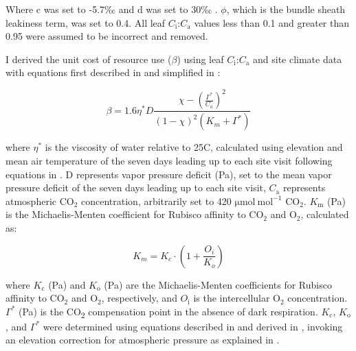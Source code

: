 \noindent Where c was set to -5.7‰ and d was set to 30‰ . $\phi$, which is the bundle sheath leakiness term, was set to 0.4. All leaf $C_\mathrm{i}$:$C_\mathrm{a}$ values less than 0.1 and greater than 0.95 were assumed to be incorrect and removed.
    
I derived the unit cost of resource use ($\beta$) using leaf $C_\mathrm{i}$:$C_\mathrm{a}$ and site climate data with equations first described in  and simplified in :

\begin{equation}
    \label{eq_4.5}
    \beta = 1.6\eta^{*} D \frac{\chi - (\frac{\Gamma^*}{C_{a}})^{2}}{(1 - \chi)^{2}(K_{m} + \Gamma^{*})}
\end{equation}
    
\noindent where $\eta^{*}$ is the viscosity of water relative to 25\textdegree{}C, calculated using elevation and mean air temperature of the seven days leading up to each site visit following equations in . D represents vapor pressure deficit (Pa), set to the mean vapor pressure deficit of the seven days leading up to each site visit, $C_\mathrm{a}$ represents atmospheric CO$_2$ concentration, arbitrarily set to 420 $\mathrm{\mu mol\ mol^{-1}}$ CO$_2$. $K_\mathrm{m}$ (Pa) is the Michaelis-Menten coefficient for Rubisco affinity to CO$_2$ and O$_2$, calculated as:
    
\begin{equation} \label{eq_4.6}
    K_{m} = K_{c} \cdot \left ( 1 + \frac{O_i}{K_o} \right )
\end{equation}

\noindent where $K_\mathrm{c}$ (Pa) and $K_\mathrm{o}$ (Pa) are the Michaelis-Menten coefficients for Rubisco affinity to CO$_2$ and O$_2$, respectively, and $O_\mathrm{i}$  is the intercellular O$_2$ concentration. $\Gamma^{*}$ (Pa) is the CO\textsubscript{2} compensation point in the absence of dark respiration. $K_\mathrm{c}$, $K_\mathrm{o}$, and $\Gamma^{*}$ were determined using equations described in  and derived in , invoking an elevation correction for atmospheric pressure as explained in .
\clearpage


